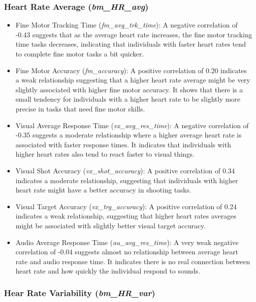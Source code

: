 \subsubsection*{Heart Rate Average (\textit{bm\_HR\_avg})}
\begin{itemize}
    \item Fine Motor Tracking Time (\textit{fm\_avg\_trk\_time}): A negative correlation of \\ -0.43 suggests that as the average heart rate increases, the fine motor
          tracking time tasks decreases, indicating that individuals with faster heart rates tend to complete fine motor tasks a bit quicker.
    \item Fine Motor Accuracy (\textit{fm\_accuracy}): A positive correlation of 0.20 indicates a weak relationship suggesting that a higher heart rate average might be very
          slightly associated with higher fine motor accuracy. It shows that there is a small tendency for individuals with a higher heart rate to be slightly more precise
          in tasks that need fine motor skills.
    \item Visual Average Response Time (\textit{vx\_avg\_res\_time}): A negative correlation of -0.35 suggests a moderate relationship where a higher average heart rate
          is associated with faster response times. It indicates that individuals with higher heart rates also tend to react faster to visual things.
    \item Visual Shot Accuracy (\textit{vx\_shot\_accuracy}): A positive correlation of 0.34 indicates a moderate relationship, suggesting that individuals with higher heart
          rate might have a better accuracy in shooting tasks.
    \item Visual Target Accuracy (\textit{vx\_trg\_accuracy}): A positive correlation of 0.24 indicates a weak relationship, suggesting that higher heart rates averages might
          be associated with slightly better visual target accuracy.
    \item Audio Average Response Time (\textit{au\_avg\_res\_time}): A very weak negative correlation of -0.04 suggests almost no relationship between average heart rate
          and audio response time. It indicates there is no real connection between heart rate and how quickly the individual respond to sounds.
\end{itemize}

\subsubsection*{Hear Rate Variability (\textit{bm\_HR\_var})}

